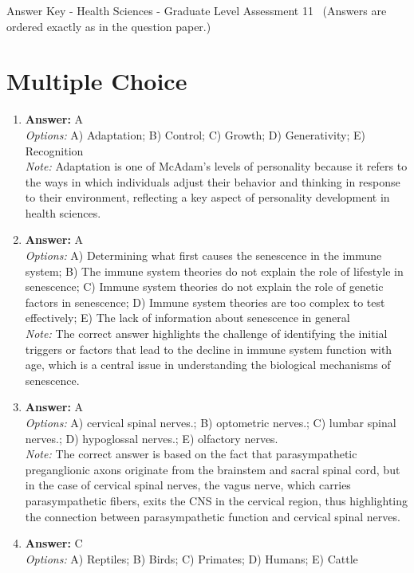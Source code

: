 \documentclass[12pt]{article}
\begin{document}
\begin{center}
Answer Key - Health Sciences - Graduate Level Assessment 11 \
\small (Answers are ordered exactly as in the question paper.)
\end{center}

\section*{Multiple Choice}
\begin{enumerate}[label=\arabic*.]
\item \textbf{Answer:} A
\\ \textit{Options:} A) Adaptation; B) Control; C) Growth; D) Generativity; E) Recognition
\\ \textit{Note:} Adaptation is one of McAdam's levels of personality because it refers to the ways in which individuals adjust their behavior and thinking in response to their environment, reflecting a key aspect of personality development in health sciences.
\item \textbf{Answer:} A
\\ \textit{Options:} A) Determining what first causes the senescence in the immune system; B) The immune system theories do not explain the role of lifestyle in senescence; C) Immune system theories do not explain the role of genetic factors in senescence; D) Immune system theories are too complex to test effectively; E) The lack of information about senescence in general
\\ \textit{Note:} The correct answer highlights the challenge of identifying the initial triggers or factors that lead to the decline in immune system function with age, which is a central issue in understanding the biological mechanisms of senescence.
\item \textbf{Answer:} A
\\ \textit{Options:} A) cervical spinal nerves.; B) optometric nerves.; C) lumbar spinal nerves.; D) hypoglossal nerves.; E) olfactory nerves.
\\ \textit{Note:} The correct answer is based on the fact that parasympathetic preganglionic axons originate from the brainstem and sacral spinal cord, but in the case of cervical spinal nerves, the vagus nerve, which carries parasympathetic fibers, exits the CNS in the cervical region, thus highlighting the connection between parasympathetic function and cervical spinal nerves.
\item \textbf{Answer:} C
\\ \textit{Options:} A) Reptiles; B) Birds; C) Primates; D) Humans; E) Cattle

\end{enumerate}
\end{document}
